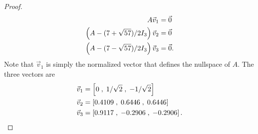 \documentclass{tutorial}
\begin{document}
\begin{proof}
\begin{align*}
  A \vec{v}_1 & = \vec{0} \\
  \left( A - (7+\sqrt{57})/2 I_3 \right) \vec{v}_2 & = \vec{0} \\
  \left( A - (7-\sqrt{57})/2 I_3 \right) \vec{v}_3 & = \vec{0} .
\end{align*}
Note that $\vec{v}_1$ is simply the normalized vector that defines the nullspace of $A$. The three vectors are
\begin{align*}
  \vec{v}_1 & = \left[ 0 \; , \; 1/\sqrt{2}\; , \; -1/\sqrt{2} \right] \\
  \vec{v}_2 & = \left[ 0.4109 \;, \; 0.6446 \; , \; 0.6446 \right] \\
  \vec{v}_3 & = \left[ 0.9117 \;, \; -0.2906 \; , \; -0.2906 \right] .
\end{align*}
\end{proof}\else \newpage \fi
\end{document}
